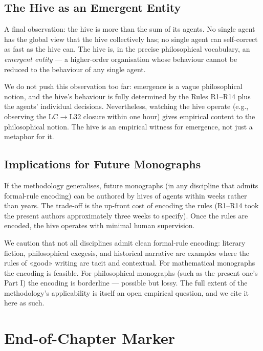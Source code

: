 \subsection{The Hive as an Emergent Entity}
\label{sec:32-hive-as-entity}

A final observation: the hive is more than the sum of its agents. No single
agent has the global view that the hive collectively has; no single agent
can self-correct as fast as the hive can. The hive is, in the precise
philosophical vocabulary, an \emph{emergent entity} — a higher-order
organisation whose behaviour cannot be reduced to the behaviour of any
single agent.

We do not push this observation too far: emergence is a vague philosophical
notion, and the hive's behaviour is fully determined by the Rules R1–R14
plus the agents' individual decisions. Nevertheless, watching the hive
operate (e.g., observing the LC$\to$L32 closure within one hour) gives
empirical content to the philosophical notion. The hive is an empirical
witness for emergence, not just a metaphor for it.

\subsection{Implications for Future Monographs}
\label{sec:32-implications}

If the methodology generalises, future monographs (in any discipline that
admits formal-rule encoding) can be authored by hives of agents within
weeks rather than years. The trade-off is the up-front cost of encoding
the rules (R1–R14 took the present authors approximately three weeks to
specify). Once the rules are encoded, the hive operates with minimal
human supervision.

We caution that not all disciplines admit clean formal-rule encoding:
literary fiction, philosophical exegesis, and historical narrative are
examples where the rules of «good» writing are tacit and contextual.
For mathematical monographs the encoding is feasible. For philosophical
monographs (such as the present one's Part I) the encoding is
borderline — possible but lossy. The full extent of the methodology's
applicability is itself an open empirical question, and we cite it here
as such.

\section{End-of-Chapter Marker}
\label{sec:32-end}

